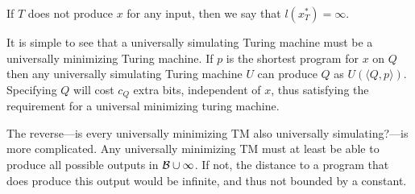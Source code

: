 \documentclass{article}
\theoremstyle{definition}
\begin{document}
If $T$ does not produce $x$ for any input, then we say that $l(x^*_T) = \infty$.

It is simple to see that a universally simulating Turing machine must be a universally minimizing Turing machine. If $p$ is the shortest program for $x$ on $Q$ then any universally simulating Turing machine $U$ can produce $Q$ as $U(\langle Q, p\rangle)$. Specifying $Q$ will cost $c_Q$ extra bits, independent of $x$, thus satisfying the requirement for a universal minimizing turing machine.

The reverse---is every universally minimizing TM also universally simulating?---is more complicated. Any universally minimizing TM must at least be able to produce all possible outputs in ${\cal B} \cup \infty$. If not, the distance to a program that does produce this output would be infinite, and thus not bounded by a constant.
\end{document}
